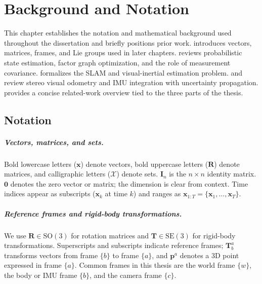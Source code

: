 \chapter{Background and Notation} \label{chapter:background}

This chapter establishes the notation and mathematical background used throughout the dissertation and briefly positions prior work.
 introduces vectors, matrices, frames, and Lie groups used in later chapters.
 reviews probabilistic state estimation, factor graph optimization, and the role of measurement covariance.
 formalizes the SLAM and visual-inertial estimation problem.
 and  review stereo visual odometry and IMU integration with uncertainty propagation.
 provides a concise related-work overview tied to the three parts of the thesis.

\section{Notation}
\label{sec:ch2_notation}

\paragraph{Vectors, matrices, and sets.}
Bold lowercase letters ($\mathbf{x}$) denote vectors, bold uppercase letters ($\mathbf{R}$) denote matrices, and calligraphic letters ($\mathcal{X}$) denote sets.
$\mathbf{I}_n$ is the $n \times n$ identity matrix.
$\mathbf{0}$ denotes the zero vector or matrix; the dimension is clear from context.
Time indices appear as subscripts ($\mathbf{x}_k$ at time $k$) and ranges as $\mathbf{x}_{1:T} = \{\mathbf{x}_1,\dots,\mathbf{x}_T\}$.

\paragraph{Reference frames and rigid-body transformations.}
We use $\mathbf{R} \in \mathrm{SO}(3)$ for rotation matrices and $\mathbf{T} \in \mathrm{SE}(3)$ for rigid-body transformations.
Superscripts and subscripts indicate reference frames; $\mathbf{T}^{a}_{b}$ transforms vectors from frame $\{b\}$ to frame $\{a\}$, and $\mathbf{p}^a$ denotes a 3D point expressed in frame $\{a\}$.
Common frames in this thesis are the world frame $\{w\}$, the body or IMU frame $\{b\}$, and the camera frame $\{c\}$.

